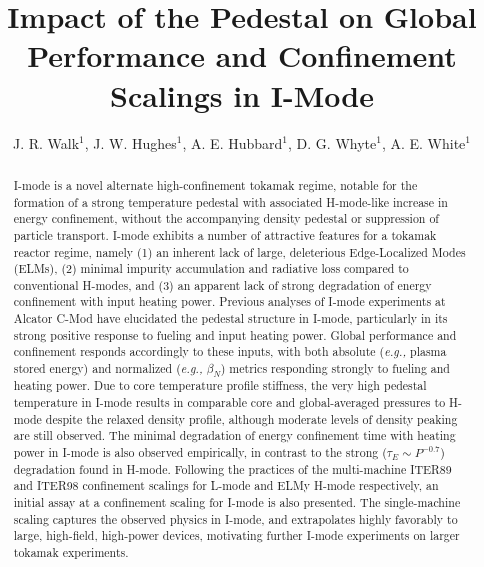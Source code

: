 \documentclass[12pt]{iopart}
\newcommand{\eg}{\emph{e.g., }}
\begin{document}
\title[Global Performance and Confinement in I-mode]{Impact of the Pedestal on Global Performance and Confinement Scalings in I-Mode}
\author{J. R. Walk$^{1}$, J. W. Hughes$^{1}$, A. E. Hubbard$^{1}$, D. G. Whyte$^{1}$, A. E. White$^{1}$}
\address{$^1$ MIT Plasma Science and Fusion Center, 77 Massachusetts Avenue, Cambridge, MA 02139}

\begin{abstract}
I-mode is a novel alternate high-confinement tokamak regime, notable for the formation of a strong temperature pedestal with associated H-mode-like increase in energy confinement, without the accompanying density pedestal or suppression of particle transport.
I-mode exhibits a number of attractive features for a tokamak reactor regime, namely (1) an inherent lack of large, deleterious Edge-Localized Modes (ELMs), (2) minimal impurity accumulation and radiative loss compared to conventional H-modes, and (3) an apparent lack of strong degradation of energy confinement with input heating power.  
Previous analyses of I-mode experiments at Alcator C-Mod have elucidated the pedestal structure in I-mode, particularly in its strong positive response to fueling and input heating power.
Global performance and confinement responds accordingly to these inputs, with both absolute (\eg plasma stored energy) and normalized (\eg $\beta_N$) metrics responding strongly to fueling and heating power.
Due to core temperature profile stiffness, the very high pedestal temperature in I-mode results in comparable core and global-averaged pressures to H-mode despite the relaxed density profile, although moderate levels of density peaking are still observed.
The minimal degradation of energy confinement time with heating power in I-mode is also observed empirically, in contrast to the strong ($\tau_E \sim P^{-0.7}$) degradation found in H-mode.
Following the practices of the multi-machine ITER89 and ITER98 confinement scalings for L-mode and ELMy H-mode respectively, an initial assay at a confinement scaling for I-mode is also presented.
The single-machine scaling captures the observed physics in I-mode, and extrapolates highly favorably to large, high-field, high-power devices, motivating further I-mode experiments on larger tokamak experiments.
\end{abstract}


\maketitle
\end{document}
